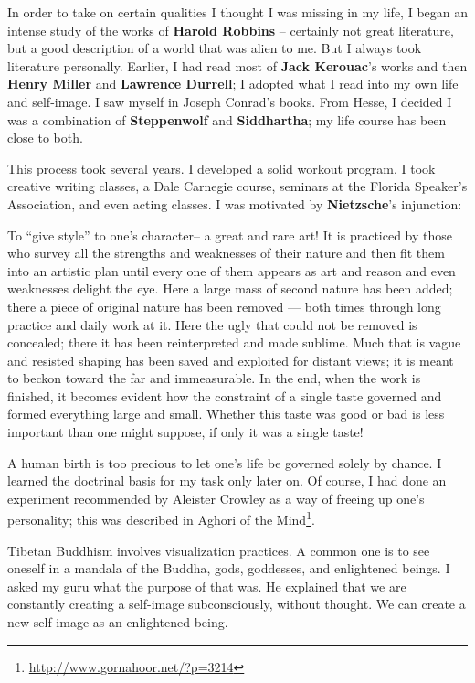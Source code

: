 In order to take on certain qualities I thought I was missing in my life, I began an intense study of the works of \textbf{Harold Robbins} -- certainly not great literature, but a good description of a world that was alien to me. But I always took literature personally. Earlier, I had read most of \textbf{Jack Kerouac}'s works and then \textbf{Henry Miller} and \textbf{Lawrence Durrell}; I adopted what I read into my own life and self-image. I saw myself in Joseph Conrad's books. From Hesse, I decided I was a combination of \textbf{Steppenwolf} and \textbf{Siddhartha}; my life course has been close to both.


This process took several years. I developed a solid workout program, I took creative writing classes, a Dale Carnegie course, seminars at the Florida Speaker's Association, and even acting classes. I was motivated by \textbf{Nietzsche}'s injunction:

\begin{quotex}
To ``give style'' to one's character-- a great and rare art! It is practiced by those who survey all the strengths and weaknesses of their nature and then fit them into an artistic plan until every one of them appears as art and reason and even weaknesses delight the eye. Here a large mass of second nature has been added; there a piece of original nature has been removed --- both times through long practice and daily work at it. Here the ugly that could not be removed is concealed; there it has been reinterpreted and made sublime. Much that is vague and resisted shaping has been saved and exploited for distant views; it is meant to beckon toward the far and immeasurable. In the end, when the work is finished, it becomes evident how the constraint of a single taste governed and formed everything large and small. Whether this taste was good or bad is less important than one might suppose, if only it was a single taste!
\end{quotex}


A human birth is too precious to let one's life be governed solely by chance. I learned the doctrinal basis for my task only later on. Of course, I had done an experiment recommended by Aleister Crowley as a way of freeing up one's personality; this was described in Aghori of the Mind\footnote{\url{http://www.gornahoor.net/?p=3214}}.

Tibetan Buddhism involves visualization practices. A common one is to see oneself in a mandala of the Buddha, gods, goddesses, and enlightened beings. I asked my guru what the purpose of that was. He explained that we are constantly creating a self-image subconsciously, without thought. We can create a new self-image as an enlightened being.

